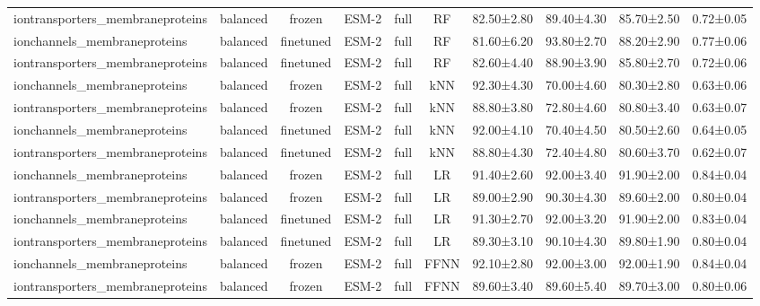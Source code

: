 \begin{tabular}{lcccccc}
iontransporters\_membraneproteins &   balanced &         frozen &        ESM-2 &      full &         RF &  82.50±2.80 &  89.40±4.30 &  85.70±2.50 & 0.72±0.05 \\
    ionchannels\_membraneproteins &   balanced &      finetuned &        ESM-2 &      full &         RF &  81.60±6.20 &  93.80±2.70 &  88.20±2.90 & 0.77±0.06 \\
iontransporters\_membraneproteins &   balanced &      finetuned &        ESM-2 &      full &         RF &  82.60±4.40 &  88.90±3.90 &  85.80±2.70 & 0.72±0.06 \\
    ionchannels\_membraneproteins &   balanced &         frozen &        ESM-2 &      full &        kNN &  92.30±4.30 &  70.00±4.60 &  80.30±2.80 & 0.63±0.06 \\
iontransporters\_membraneproteins &   balanced &         frozen &        ESM-2 &      full &        kNN &  88.80±3.80 &  72.80±4.60 &  80.80±3.40 & 0.63±0.07 \\
    ionchannels\_membraneproteins &   balanced &      finetuned &        ESM-2 &      full &        kNN &  92.00±4.10 &  70.40±4.50 &  80.50±2.60 & 0.64±0.05 \\
iontransporters\_membraneproteins &   balanced &      finetuned &        ESM-2 &      full &        kNN &  88.80±4.30 &  72.40±4.80 &  80.60±3.70 & 0.62±0.07 \\
    ionchannels\_membraneproteins &   balanced &         frozen &        ESM-2 &      full &         LR &  91.40±2.60 &  92.00±3.40 &  91.90±2.00 & 0.84±0.04 \\
iontransporters\_membraneproteins &   balanced &         frozen &        ESM-2 &      full &         LR &  89.00±2.90 &  90.30±4.30 &  89.60±2.00 & 0.80±0.04 \\
    ionchannels\_membraneproteins &   balanced &      finetuned &        ESM-2 &      full &         LR &  91.30±2.70 &  92.00±3.20 &  91.90±2.00 & 0.83±0.04 \\
iontransporters\_membraneproteins &   balanced &      finetuned &        ESM-2 &      full &         LR &  89.30±3.10 &  90.10±4.30 &  89.80±1.90 & 0.80±0.04 \\
    ionchannels\_membraneproteins &   balanced &         frozen &        ESM-2 &      full &       FFNN &  92.10±2.80 &  92.00±3.00 &  92.00±1.90 & 0.84±0.04 \\
iontransporters\_membraneproteins &   balanced &         frozen &        ESM-2 &      full &       FFNN &  89.60±3.40 &  89.60±5.40 &  89.70±3.00 & 0.80±0.06 \\

\end{tabular}
